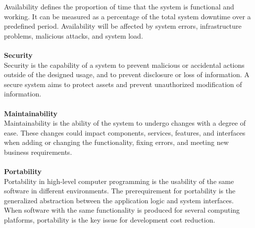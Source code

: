 \documentclass[a4paper,11pt]{article}
\begin{document}
	    Availability defines the proportion of time that the system is functional and working. It can be measured 
	    as a percentage of the total system downtime over a predefined period. Availability will be affected by 
	    system errors, infrastructure problems, malicious attacks, and system load.
	    \\\\
	  {\bf Security}
	  \\
	  
	    Security is the capability of a system to prevent malicious or accidental actions outside of the designed 
	    usage, and to prevent disclosure or loss of information. A secure system aims to protect assets and prevent 
	    unauthorized modification of information.
	    \\\\
	  {\bf Maintainability}
	  \\
	  
	    Maintainability is the ability of the system to undergo changes with a degree of ease. These changes could 
	    impact components, services, features, and interfaces when adding or changing the functionality, fixing 
	    errors, and meeting new business requirements.
	    \\\\
	  {\bf Portability}
	  \\
	  
	    Portability in high-level computer programming is the usability of the same software in different environments. 
	    The prerequirement for portability is the generalized abstraction between the application logic and system 
	    interfaces. When software with the same functionality is produced for several computing platforms, portability
	    is the key issue for development cost reduction.
\end{document}
